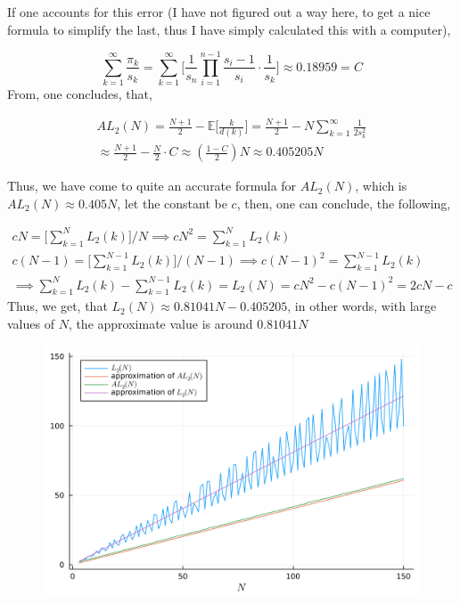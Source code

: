 \documentclass{article}
\begin{document}
If one accounts for this error (I have not figured out a way here, to get a nice formula to simplify the last, thus I have simply calculated this with a computer),

\begin{equation}
	\sum_{k = 1}^{\infty} \frac{\pi_k}{s_k}  = \sum_{k = 1}^{\infty} \biggl[ \frac{1}{s_n} \prod_{i = 1}^{n - 1} \frac{s_i - 1}{s_i} \cdot \frac{1}{s_k} \biggr] \approx 0.18959 = C
\end{equation}
From, one concludes, that,

\begin{multline}
	AL_2(N) = \frac{N + 1}{2} - \mathbb{E} \biggl[ \frac{k}{d(k)} \biggr] = \frac{N + 1}{2} - N \sum_{k = 1}^{\infty} \frac{1}{2 s_k^2}
    \\ \approx \frac{N + 1}{2} - \frac{N}{2} \cdot C \approx \left( \frac{1 - C}{2} \right) N \approx 0.405205 N
\end{multline}

Thus, we have come to quite an accurate formula for \(AL_2(N)\), which is \(AL_2(N) \approx 0.405 N\), let the constant be \(c\), then, one can conclude, the following,

\begin{gather}
    cN = \biggl[ \sum_{k = 1}^N L_2(k) \biggr] / N \implies c N^2 = \sum_{k = 1}^N L_2(k) \\
    c(N - 1) = \biggl[ \sum_{k = 1}^{N - 1} L_2(k) \biggr] / (N - 1) \implies c (N - 1)^2 = \sum_{k = 1}^{N - 1} L_2(k) \\
    \implies \sum_{k = 1}^N L_2(k) - \sum_{k = 1}^{N - 1} L_2(k) = L_2(N) = cN^2 - c(N - 1)^2 = 2cN - c
\end{gather}
Thus, we get, that \(L_2(N) \approx 0.81041 N - 0.405205\), in other words, with large values of \(N\), the approximate value is around \(0.81041 N\)

\begin{figure}[htbp]
    \centering
    \includegraphics[width=\textwidth]{images/L_2_complete_analysis.png}
    \label{fig:figure1}
\end{figure}
\end{document}
